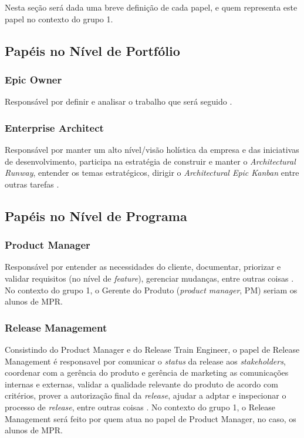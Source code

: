 Nesta seção será dada uma breve definição de cada papel, e quem representa este papel no contexto do grupo 1.

\subsection{Papéis no Nível de Portfólio}
\subsubsection{Epic Owner}
Responsável por definir e analisar o trabalho que será seguido \cite[p. 418-419]{safe007}.

\subsubsection{Enterprise Architect}
Responsável por manter um alto nível/visão holística da empresa e das iniciativas de desenvolvimento, participa na estratégia de construir e manter o \emph{Architectural Runway}, entender os temas estratégicos, dirigir o \emph{Architectural Epic Kanban} entre outras tarefas \cite{safesite001}.

\subsection{Papéis no Nível de Programa}

\subsubsection{Product Manager}
Responsável por entender as necessidades do cliente, documentar, priorizar e validar requisitos (no nível de \emph{feature}), gerenciar mudanças, entre outras coisas \cite[p. 283-287]{safe001}. No contexto do grupo 1, o Gerente do Produto (\emph{product manager}, PM) seriam os alunos de MPR.

\subsubsection{Release Management}
Consistindo do Product Manager e do Release Train Engineer, o papel de Release Management é responsavel por comunicar o \emph{status} da release aos \emph{stakeholders}, coordenar com a gerência do produto e gerência de marketing as comunicações internas e externas, validar a qualidade relevante do produto de acordo com critérios, prover a autorização final da \emph{release}, ajudar a adptar e inspecionar o processo de \emph{release}, entre outras coisas \cite{safesite001}.
No contexto do grupo 1, o Release Management será feito por quem atua no papel de Product Manager, no caso, os alunos de MPR.

